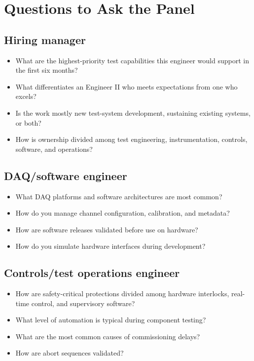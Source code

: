 \documentclass[11pt]{article}
\begin{document}
\section{Questions to Ask the Panel}

\subsection{Hiring manager}
\begin{itemize}
  \item What are the highest-priority test capabilities this engineer would support in the first six months?
  \item What differentiates an Engineer II who meets expectations from one who excels?
  \item Is the work mostly new test-system development, sustaining existing systems, or both?
  \item How is ownership divided among test engineering, instrumentation, controls, software, and operations?
\end{itemize}

\subsection{DAQ/software engineer}
\begin{itemize}
  \item What DAQ platforms and software architectures are most common?
  \item How do you manage channel configuration, calibration, and metadata?
  \item How are software releases validated before use on hardware?
  \item How do you simulate hardware interfaces during development?
\end{itemize}

\subsection{Controls/test operations engineer}
\begin{itemize}
  \item How are safety-critical protections divided among hardware interlocks, real-time control, and supervisory software?
  \item What level of automation is typical during component testing?
  \item What are the most common causes of commissioning delays?
  \item How are abort sequences validated?
\end{itemize}
\end{document}
